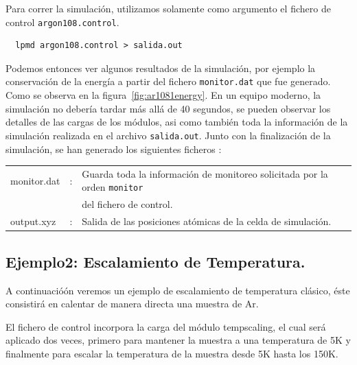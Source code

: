 Para correr la simulaci\'on, utilizamos solamente como argumento el fichero de control \verb|argon108.control|.
\begin{verbatim}
  lpmd argon108.control > salida.out
\end{verbatim}


Podemos entonces ver algunos resultados de la simulaci\'on, por ejemplo la conservaci\'on de la energ\'ia a partir del fichero \verb|monitor.dat| que fue generado. Como se observa en la figura~\ref{fig:ar1081energy}. En un equipo moderno, la simulaci\'on no deber\'ia tardar m\'as all\'a de 40 segundos, se pueden observar los detalles de las cargas de los m\'odulos, asi como tambi\'en toda la informaci\'on de la simulaci\'on realizada en el archivo \verb|salida.out|. Junto con la finalizaci\'on de la simulaci\'on, se han generado los siguientes ficheros :

\begin{tabular}{lcl}\\
 monitor.dat &:& Guarda toda la informaci\'on de monitoreo solicitada por la orden \verb|monitor|\\
&& del fichero de control. \\
 output.xyz &:& Salida de las posiciones at\'omicas de la celda de simulaci\'on. \\
\end{tabular}

\subsection{Ejemplo2: Escalamiento de Temperatura.}

A continuació\'on veremos un ejemplo de escalamiento de temperatura cl\'asico, \'este consistir\'a en calentar de manera directa una muestra de Ar. 

El fichero de control incorpora la carga del m\'odulo tempscaling, el cual ser\'a aplicado dos veces, primero para mantener la muestra a una temperatura de 5K y finalmente para escalar la temperatura de la muestra desde 5K hasta los 150K.

